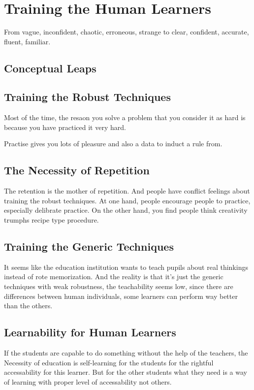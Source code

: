 \section{Training the Human Learners}

From vague, inconfident, chaotic, erroneous, strange to clear, confident, accurate, fluent, familiar.

\subsection{Conceptual Leaps}
\subsection{Training the Robust Techniques}
Most of the time, the resaon you solve a problem that you consider it as hard is because you have practiced it very hard.

Practise gives you lots of pleasure and also a data to induct a rule from.

\subsection{The Necessity of Repetition}
The retention is the mother of repetition. And people have conflict feelings about training the robust techniques. At one hand, people encourage people to practice, especially delibrate practice. On the other hand, you find people think creativity trumphs recipe type procedure.


\subsection{Training the Generic Techniques}

It seems like the education institution wants to teach pupils about real thinkings instead of rote memorization. And the reality is that it's just the generic techniques with weak robustness, the teachability seems low, since there are differences between human individuals, some learners can perform way better than the others.

\subsection{Learnability for Human Learners}
If the students are capable to do something without the help of the teachers, the Necessity of education is self-learning for the students for the rightful accessability for this learner. But for the other students what they need is a way of learning with proper level of accessability not others.

